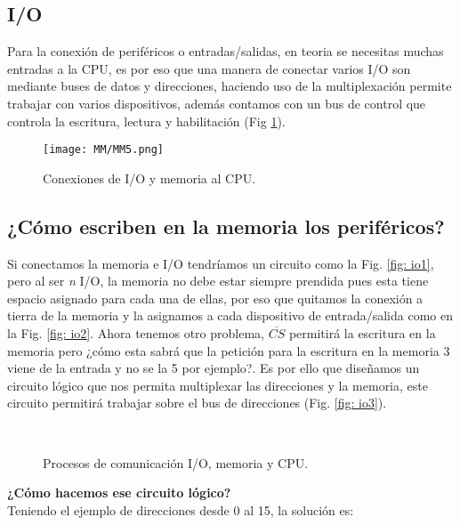 \documentclass[
	12pt, %
	fleqn, %
	a4paper, %
]{LegrandOrangeBook}
\begin{document}
\subsection{I/O}
Para la conexión de periféricos o entradas/salidas, en teoria se necesitas muchas entradas a la CPU, es por eso que una manera de conectar varios I/O son mediante buses de datos y direcciones, haciendo uso de la multiplexación permite trabajar con varios dispositivos, además contamos con un bus de control que controla la escritura, lectura y habilitación (Fig \ref{fig:I/O cpy y memoria}).
\begin{figure}[]
\centering
\texttt{[image: MM/MM5.png]}
\caption{Conexiones de I/O y memoria al CPU.}
\label{fig:I/O cpy y memoria}
\end{figure}
\subsection{¿Cómo escriben en la memoria los periféricos?}
Si conectamos la memoria e I/O tendríamos un circuito como la Fig. \ref{fig: io1}, pero al ser \textit{n} I/O, la memoria no debe estar siempre prendida pues esta tiene espacio asignado para cada una de ellas, por eso que quitamos la conexión a tierra de la memoria y la asignamos a cada dispositivo de entrada/salida como en la Fig. \ref{fig: io2}. Ahora tenemos otro problema, $\overline{CS}$ permitirá la escritura en la memoria pero ¿cómo esta sabrá que la petición para la escritura en la memoria 3 viene de la entrada y no se la 5 por ejemplo?. Es por ello que diseñamos un circuito lógico que nos permita multiplexar las direcciones y la memoria, este circuito permitirá trabajar sobre el bus de direcciones (Fig. \ref{fig: io3}).\\
\begin{figure}[]
\centering
{}
\\
\caption{Procesos de comunicación I/O, memoria y CPU.}
\end{figure}
\textbf{¿Cómo hacemos ese circuito lógico?}\\
Teniendo el ejemplo de direcciones desde 0 al 15, la solución es:
\end{document}
